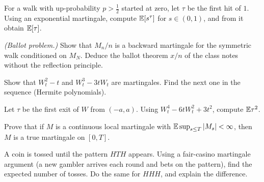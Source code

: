 \begin{exercises}
\item For a walk with up-probability $p>\tfrac12$ started at zero, let $\tau$ be the first hit of $1$. Using an exponential martingale, compute $\mathbb{E}[s^{\tau}]$ for $s\in(0,1)$, and from it obtain $\mathbb{E}[\tau]$.
\item \emph{(Ballot problem.)} Show that $M_n/n$ is a backward martingale for the symmetric walk conditioned on $M_N$. Deduce the ballot theorem $x/n$ of the class notes without the reflection principle.
\item Show that $W_t^2-t$ and $W_t^3-3tW_t$ are martingales. Find the next one in the sequence (Hermite polynomials).
\item Let $\tau$ be the first exit of $W$ from $(-a,a)$. Using $W_t^4-6tW_t^2+3t^2$, compute $\mathbb{E}\tau^2$.
\item Prove that if $M$ is a continuous local martingale with $\mathbb{E}\sup_{s\le T}|M_s|<\infty$, then $M$ is a true martingale on $[0,T]$.
\item A coin is tossed until the pattern $HTH$ appears. Using a fair-casino martingale argument (a new gambler arrives each round and bets on the pattern), find the expected number of tosses. Do the same for $HHH$, and explain the difference.
\end{exercises}
